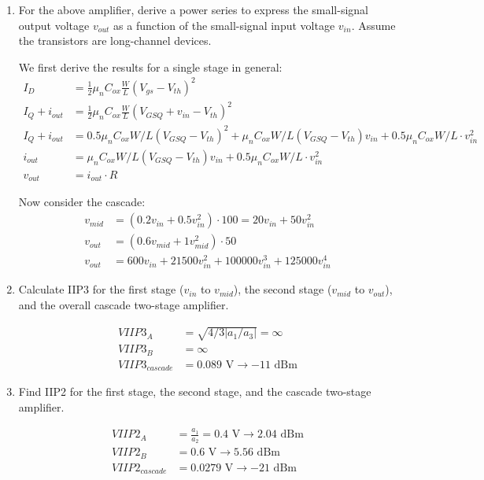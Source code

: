 \begin{enumerate}[label=(\alph*)]
    \item {\color{blue} For the above amplifier, derive a power series to express the small-signal output voltage $v_{out}$ as a function of the small-signal input voltage $v_{in}$. Assume the transistors are long-channel devices.}

    We first derive the results for a single stage in general:
    \begin{align*}
        I_D &= \frac{1}{2} \mu_n C_{ox} \frac{W}{L} (V_{gs} - V_{th})^2 \\
        I_Q + i_{out} &= \frac{1}{2} \mu_n C_{ox} \frac{W}{L} (V_{GSQ} + v_{in} - V_{th})^2 \\
        I_Q + i_{out} &= 0.5 \mu_n C_{ox} W/L (V_{GSQ} - V_{th})^2 + \mu_n C_{ox} W/L (V_{GSQ} - V_{th})v_{in} + 0.5 \mu_n C_{ox} W/L \cdot v_{in}^2 \\
        i_{out} &= \mu_n C_{ox} W/L (V_{GSQ} - V_{th})v_{in} + 0.5 \mu_n C_{ox} W/L \cdot v_{in}^2 \\
        v_{out} &= i_{out} \cdot R
    \end{align*}

    Now consider the cascade:
    \begin{align*}
        v_{mid} &= (0.2 v_{in} + 0.5 v_{in}^2) \cdot 100 = 20 v_{in} + 50 v_{in}^2 \\
        v_{out} &= (0.6 v_{mid} + 1 v_{mid}^2) \cdot 50 \\
        v_{out} &= 600 v_{in} + 21500 v_{in}^2 + 100000 v_{in}^3 + 125000 v_{in}^4
    \end{align*}

    \item {\color{blue} Calculate IIP3 for the first stage ($v_{in}$ to $v_{mid}$), the second stage ($v_{mid}$ to $v_{out}$), and the overall cascade two-stage amplifier.}

    \begin{align*}
        VIIP3_A &= \sqrt{4/3 |a_1/a_3|} = \infty \\
        VIIP3_B &= \infty \\
        VIIP3_{cascade} &= 0.089 \text{ V} \rightarrow -11 \text{ dBm}
    \end{align*}

    \item {\color{blue} Find IIP2 for the first stage, the second stage, and the cascade two-stage amplifier.}

    \begin{align*}
        VIIP2_A &= \frac{a_1}{a_2} = 0.4 \text{ V} \rightarrow 2.04 \text{ dBm} \\
        VIIP2_B &= 0.6 \text{ V} \rightarrow 5.56 \text{ dBm} \\
        VIIP2_{cascade} &= 0.0279 \text{ V} \rightarrow -21 \text{ dBm} \\
    \end{align*}


\end{enumerate}
